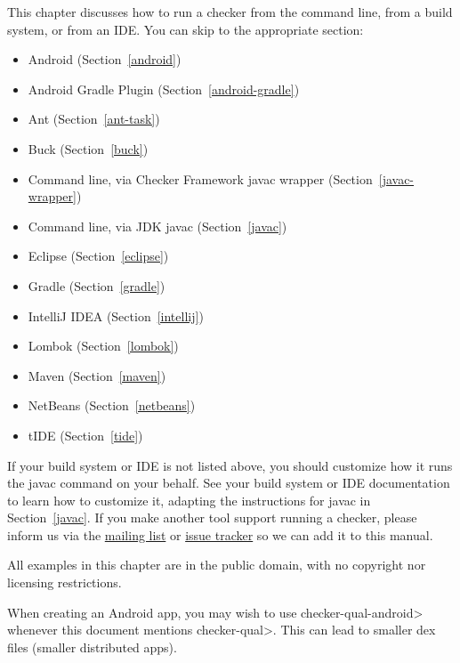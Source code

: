 \htmlhr
{}

This chapter discusses how to run a checker from the command line, from a
build system, or from an IDE\@.  You can skip to the appropriate section:

\begin{itemize}
\item Android (Section~\ref{android})
\item Android Gradle Plugin (Section~\ref{android-gradle})
\item Ant (Section~\ref{ant-task})
\item Buck (Section~\ref{buck})
\item Command line, via Checker Framework javac wrapper (Section~\ref{javac-wrapper})
\item Command line, via JDK javac (Section~\ref{javac})
\item Eclipse (Section~\ref{eclipse})
\item Gradle (Section~\ref{gradle})
\item IntelliJ IDEA (Section~\ref{intellij})
\item Lombok (Section~\ref{lombok})
\item Maven (Section~\ref{maven})
\item NetBeans (Section~\ref{netbeans})
\item tIDE (Section~\ref{tide})
\end{itemize}

If your build system or IDE is not listed above, you should customize how
it runs the javac command on your behalf.  See your build system or IDE
documentation to learn how to
customize it, adapting the instructions for javac in Section~\ref{javac}.
If you make another tool support running a checker, please
inform us via the
\href{https://groups.google.com/forum/#!forum/checker-framework-discuss}{mailing
  list} or
\href{https://github.com/typetools/checker-framework/issues}{issue tracker} so
we can add it to this manual.

All examples in this chapter are in the public domain, with no copyright nor
licensing restrictions.



When creating an Android app, you may wish to use \<checker-qual-android>
whenever this document mentions \<checker-qual>.  This can lead to smaller
dex files (smaller distributed apps).

